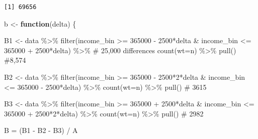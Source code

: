 \documentclass[
  letterpaper,
  DIV=11,
  numbers=noendperiod]{scrartcl}
\newenvironment{Shaded}{\begin{snugshade}}{\end{snugshade}}
\newcommand{\AttributeTok}[1]{\textcolor[rgb]{0.40,0.45,0.13}{#1}}
\newcommand{\CommentTok}[1]{\textcolor[rgb]{0.37,0.37,0.37}{#1}}
\newcommand{\ControlFlowTok}[1]{\textcolor[rgb]{0.00,0.23,0.31}{\textbf{#1}}}
\newcommand{\DecValTok}[1]{\textcolor[rgb]{0.68,0.00,0.00}{#1}}
\newcommand{\FunctionTok}[1]{\textcolor[rgb]{0.28,0.35,0.67}{#1}}
\newcommand{\NormalTok}[1]{\textcolor[rgb]{0.00,0.23,0.31}{#1}}
\newcommand{\OtherTok}[1]{\textcolor[rgb]{0.00,0.23,0.31}{#1}}
\newcommand{\SpecialCharTok}[1]{\textcolor[rgb]{0.37,0.37,0.37}{#1}}
\begin{document}
\begin{verbatim}
[1] 69656
\end{verbatim}

\begin{Shaded}
\begin{Highlighting}[]
\NormalTok{b }\OtherTok{\textless{}{-}} \ControlFlowTok{function}\NormalTok{(delta) \{}

\NormalTok{B1  }\OtherTok{\textless{}{-}}\NormalTok{ data }\SpecialCharTok{\%\textgreater{}\%} 
  \FunctionTok{filter}\NormalTok{(income\_bin }\SpecialCharTok{\textgreater{}=} \DecValTok{365000} \SpecialCharTok{{-}} \DecValTok{2500}\SpecialCharTok{*}\NormalTok{delta }\SpecialCharTok{\&}\NormalTok{ income\_bin }\SpecialCharTok{\textless{}=} \DecValTok{365000} \SpecialCharTok{+} \DecValTok{2500}\SpecialCharTok{*}\NormalTok{delta) }\SpecialCharTok{\%\textgreater{}\%}  \CommentTok{\# 25,000 differences}
  \FunctionTok{count}\NormalTok{(}\AttributeTok{wt=}\NormalTok{n) }\SpecialCharTok{\%\textgreater{}\%} 
  \FunctionTok{pull}\NormalTok{() }\CommentTok{\#8,574}

\NormalTok{B2 }\OtherTok{\textless{}{-}}\NormalTok{ data }\SpecialCharTok{\%\textgreater{}\%} 
  \FunctionTok{filter}\NormalTok{(income\_bin }\SpecialCharTok{\textgreater{}=} \DecValTok{365000} \SpecialCharTok{{-}} \DecValTok{2500}\SpecialCharTok{*}\DecValTok{2}\SpecialCharTok{*}\NormalTok{delta }\SpecialCharTok{\&}\NormalTok{ income\_bin }\SpecialCharTok{\textless{}=} \DecValTok{365000} \SpecialCharTok{{-}} \DecValTok{2500}\SpecialCharTok{*}\NormalTok{delta) }\SpecialCharTok{\%\textgreater{}\%} 
  \FunctionTok{count}\NormalTok{(}\AttributeTok{wt=}\NormalTok{n) }\SpecialCharTok{\%\textgreater{}\%} 
  \FunctionTok{pull}\NormalTok{() }\CommentTok{\# 3615}

\NormalTok{B3 }\OtherTok{\textless{}{-}}\NormalTok{ data }\SpecialCharTok{\%\textgreater{}\%} 
  \FunctionTok{filter}\NormalTok{(income\_bin }\SpecialCharTok{\textgreater{}=} \DecValTok{365000} \SpecialCharTok{+} \DecValTok{2500}\SpecialCharTok{*}\NormalTok{delta }\SpecialCharTok{\&}\NormalTok{ income\_bin }\SpecialCharTok{\textless{}=} \DecValTok{365000} \SpecialCharTok{+} \DecValTok{2500}\SpecialCharTok{*}\DecValTok{2}\SpecialCharTok{*}\NormalTok{delta) }\SpecialCharTok{\%\textgreater{}\%} 
  \FunctionTok{count}\NormalTok{(}\AttributeTok{wt=}\NormalTok{n) }\SpecialCharTok{\%\textgreater{}\%} 
  \FunctionTok{pull}\NormalTok{() }\CommentTok{\# 2982}

\NormalTok{B }\OtherTok{=}\NormalTok{ (B1 }\SpecialCharTok{{-}}\NormalTok{ B2 }\SpecialCharTok{{-}}\NormalTok{ B3) }\SpecialCharTok{/}\NormalTok{ A}


\end{Highlighting}
\end{Shaded}
\end{document}
